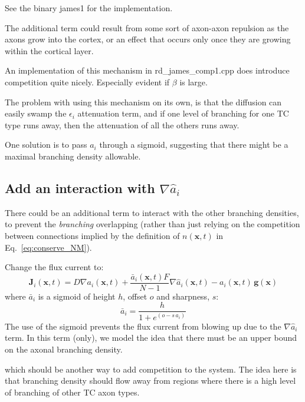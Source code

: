 \documentclass[11pt, a4paper]{article}
\newcommand{\mb}[1]{\mathbf{#1}} %
\newcommand{\code}[1]{\textsf{#1}}
\begin{document}
See the binary \code{james1} for the implementation.

The additional term could result from some sort of axon-axon repulsion
as the axons grow into the cortex, or an effect that occurs only once
they are growing within the cortical layer.

An implementation of this mechanism in \code{rd\_james\_comp1.cpp}
does introduce competition quite nicely. Especially evident if $\beta$
is large.

The problem with using this mechanism on its own, is that the
diffusion can easily swamp the $\epsilon_i$ attenuation term, and if
one level of branching for one TC type runs away, then the attenuation
of all the others runs away.

One solution is to pass $a_i$ through a sigmoid, suggesting that there
might be a maximal branching density allowable.

\subsection{Add an interaction with $\nabla \hat{a}_i$}
\label{sec:comp2}

There could be an additional term to interact with the other branching
densities, to prevent the \emph{branching} overlapping (rather than
just relying on the competition between connections implied by the
definition of $n(\mb{x},t)$ in Eq.~\ref{eq:conserve_NM}).

Change the flux current to:
%
\begin{equation} \label{eq:J_NM_with_comp}
\mb{J}_i(\mb{x},t) = D \nabla a_i(\mb{x},t)
+ \frac{\bar{a}_i(\mb{x}, t) F}{N-1} \nabla \hat{a}_i(\mb{x}, t) -
a_i(\mb{x}, t) \, \mb{g}(\mb{x})
\end{equation}
%
where $\bar{a}_i$ is a sigmoid of height $h$, offset $o$ and
sharpness, $s$:
\begin{equation}
\bar{a}_i = \frac{h}{1 + e^{(o - s \, a_i)}}
\end{equation}
%
The use of the sigmoid prevents the flux current from blowing up due
to the $\nabla \hat{a}_i$ term. In this term (only), we model the idea
that there must be an upper bound on the axonal branching density.

which should be another way to add competition to the system. The idea
here is that branching density should flow away from regions where
there is a high level of branching of other TC axon types.
\end{document}
